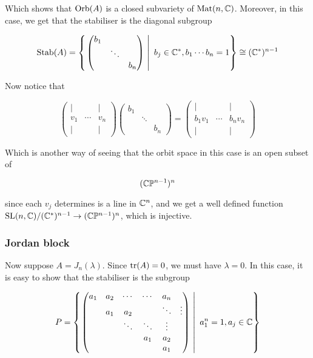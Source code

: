 \documentclass{article}
\begin{document}
Which shows that \(\operatorname{Orb}(A)\) is a closed subvariety of \(\operatorname{Mat}(n, \mathbb{C})\). Moreover, in this case, we get that the stabiliser is the diagonal subgroup

\[\operatorname{Stab}(A) = \left\{\left.\begin{pmatrix}
    b_1 & \\
    & \ddots \\
    & & b_n
\end{pmatrix}\ \right\vert\ b_j \in \mathbb{C}^*, b_1\cdots b_n = 1 \right\} \cong (\mathbb{C}^*)^{n-1}\]

Now notice that

\[\begin{pmatrix}
    \vert & & \vert \\
    v_1 & \cdots & v_n \\
    \vert & & \vert
\end{pmatrix}\begin{pmatrix}
    b_1 & \\
    & \ddots \\
    & & b_n
\end{pmatrix} = \begin{pmatrix}
    \vert & & \vert \\
    b_1v_1 & \cdots & b_nv_n \\
    \vert & & \vert
\end{pmatrix}\]

Which is another way of seeing that the orbit space in this case is an open subset of

\[(\mathbb{C} \mathbb{P}^{n-1})^n\]

since each \(v_j\) determines is a line in \(\mathbb{C}^n\), and we get a well defined function \(\operatorname{SL}(n, \mathbb{C})/(\mathbb{C}^*)^{n-1} \to (\mathbb{C} \mathbb{P}^{n-1})^n\), which is injective.

\subsubsection{Jordan block}

Now suppose \(A = J_n(\lambda)\). Since \(\tr(A) = 0\), we must have \(\lambda = 0\). In this case, it is easy to show that the stabiliser is the subgroup

\[P = \left\{\left.\begin{pmatrix}
    a_1 & a_2 & \cdots & \cdots & a_n \\
    & a_1 & a_2 & &\ddots & \vdots \\
    & & \ddots & \ddots & \vdots \\
    & & & a_1 & a_2 \\
    & & & & a_1
\end{pmatrix}\ \right\vert\ a_1^n = 1, a_j \in \mathbb{C} \right\}\]
\end{document}
